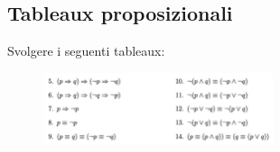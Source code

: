 \documentclass[12pt,a4paper]{article}
\begin{document}
    \subsection{Tableaux proposizionali}
    \begin{Exercise}
    Svolgere i seguenti tableaux:
        \begin{figure}[h!]
            \centering
            \includegraphics[width=0.6\textwidth]{images/esTableaux.jpeg}
            \label{fig:esTableaux1}
        \end{figure}
    \end{Exercise}
    
    
\end{document}
